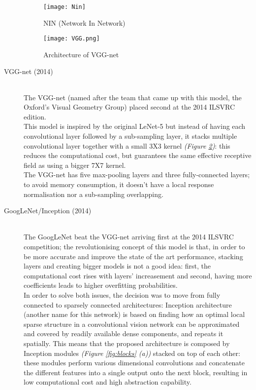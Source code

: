 \documentclass[../main.tex]{subfiles}
\begin{document}
\begin{description}
\vspace*{5mm}
\begin{figure}[H]
  \centering
  \texttt{[image: Nin]}
  \caption{NIN (Network In Network) \cite{Lin2013}}
  \label{fig:nin}
\end{figure}
\clearpage
\newpage

\begin{figure}[H]
  \centering
  \texttt{[image: VGG.png]}
  \caption{Architecture of VGG-net \cite{VGG}}
  \label{fig:vggnet}
\end{figure}

\item[VGG-net (2014)] \cite{Simonyan2015} \hfill \\
The VGG-net (named after the team that came up with this model, the Oxford's Visual Geometry Group) placed second at the 2014 ILSVRC edition. \\ This model is inspired by the original LeNet-5 \cite{LeCun1998} but instead of having each convolutional layer followed by a sub-sampling layer, it stacks multiple convolutional layer together with a small 3X3 kernel \textit{(Figure \ref{fig:vggnet})}: this reduces the computational cost, but guarantees the same effective receptive field as using a bigger 7X7 kernel.\cite{Simonyan2015} \\
The VGG-net has five max-pooling layers and three fully-connected layers; to avoid memory consumption, it doesn't have a local response normalisation nor a sub-sampling overlapping. \\

\item[GoogLeNet/Inception (2014)] \cite{Szegedy2015} \hfill \\ 
The GoogLeNet beat the VGG-net arriving first at the 2014 ILSVRC competition; the revolutionising concept of this model is that, in order to be more accurate and improve the state of the art performance, stacking layers and creating bigger models is not a good idea: first, the computational cost rises with layers' increasement and second, having more coefficients leads to higher overfitting probabilities. \\ 
In order to solve both issues, the decision was to move from fully connected to sparsely connected architectures: Inception architecture (another name for this network) is based on finding how an optimal local sparse structure in a convolutional vision network can be approximated and covered by readily available dense components, and repeats it spatially.\cite{Szegedy2015}
This means that the proposed architecture is composed by Inception modules \textit{(Figure \ref{fig:blocks} (a))} stacked on top of each other: these modules perform various dimensional convolutions and concatenate the different features into a single output onto the next block, resulting in low computational cost and high abstraction capability.\\


\end{description}
\end{document}
